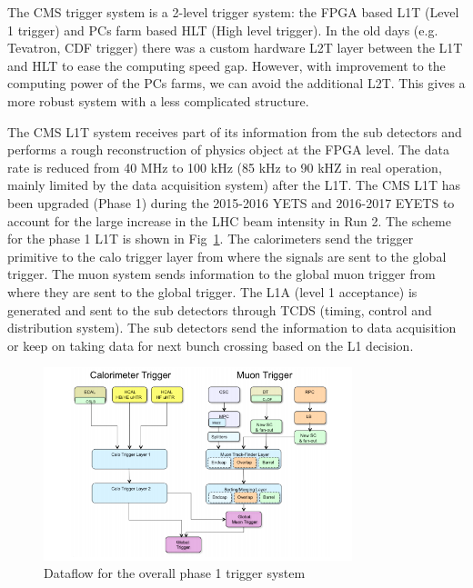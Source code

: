 The CMS trigger system is a 2-level trigger system: the FPGA based L1T (Level 1 trigger) and PCs farm based HLT (High level trigger). In the old days (e.g. Tevatron, CDF trigger) there was a custom hardware L2T layer between the L1T and HLT to ease the computing speed gap. However, with improvement to the computing power of the PCs farms, we can avoid the additional L2T. This gives a more robust system with a less complicated structure. 

The CMS L1T system receives part of its information from the sub detectors and performs a rough reconstruction of physics object at the FPGA level. The data rate is reduced from 40 MHz to 100 kHz (85 kHz to 90 kHZ in real operation, mainly limited by the data acquisition system) after the L1T. The CMS L1T has been upgraded (Phase 1) during the 2015-2016 YETS and 2016-2017 EYETS to account for the large increase in the LHC beam intensity in Run 2. The scheme for the phase 1 L1T is shown in Fig~\ref{fig:c3cmsl1scheme}. The calorimeters send the trigger primitive to the calo trigger layer from where the signals are sent to the global trigger. The muon system sends information to the global muon trigger from where they are sent to the global trigger. The L1A (level 1 acceptance) is generated and sent to the sub detectors through TCDS (timing, control and distribution system). The sub detectors send the information to data acquisition or keep on taking data for next bunch crossing based on the L1 decision. 

\begin{figure}[htbp]
 \begin{center}
  \includegraphics[width=0.8\textwidth]{figures/c3/c3_cms_l1scheme.png}
 \end{center}
 \caption{Dataflow for the overall phase 1 trigger system}
 \label{fig:c3cmsl1scheme}
\end{figure}

